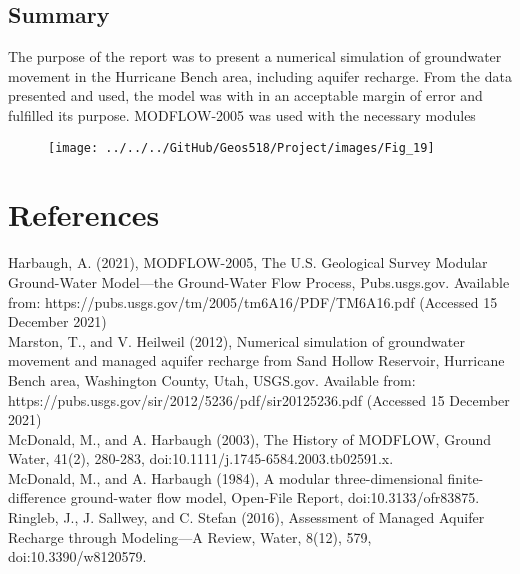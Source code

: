 \documentclass[]{report}
\begin{document}
\section{Summary}
The purpose of the report was to present a numerical simulation of groundwater movement in the Hurricane Bench area, including aquifer recharge. From the data presented and used, the model was with in an acceptable margin of error and fulfilled its purpose. MODFLOW-2005 was used with the necessary modules
\begin{figure}[h]
	\centering
	\texttt{[image: ../../../GitHub/Geos518/Project/images/Fig\_19]}
\end{figure}






\chapter{References}
Harbaugh, A. (2021), MODFLOW-2005, The U.S. Geological Survey Modular Ground-Water Model—the Ground-Water Flow Process, Pubs.usgs.gov. Available from: https://pubs.usgs.gov/tm/2005/tm6A16/PDF/TM6A16.pdf (Accessed 15 December 2021)\\

Marston, T., and V. Heilweil (2012), Numerical simulation of groundwater movement and managed aquifer recharge from Sand Hollow Reservoir, Hurricane Bench area, Washington County, Utah, USGS.gov. Available from: https://pubs.usgs.gov/sir/2012/5236/pdf/sir20125236.pdf (Accessed 15 December 2021)\\

McDonald, M., and A. Harbaugh (2003), The History of MODFLOW, Ground Water, 41(2), 280-283, doi:10.1111/j.1745-6584.2003.tb02591.x.\\

McDonald, M., and A. Harbaugh (1984), A modular three-dimensional finite-difference ground-water flow model, Open-File Report, doi:10.3133/ofr83875.\\

Ringleb, J., J. Sallwey, and C. Stefan (2016), Assessment of Managed Aquifer Recharge through Modeling—A Review, Water, 8(12), 579, doi:10.3390/w8120579.\\
\end{document}
